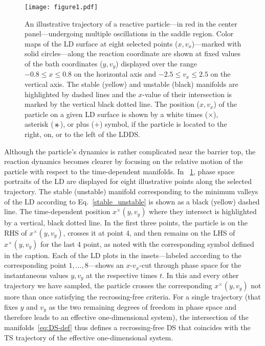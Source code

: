 \documentclass{elsarticle}
\def\EDITS#1{{\color{green}#1}}
\def\EDITS#1{#1}
\def\EDITS#1{{\color{mygreen}#1}}
\begin{document}
\begin{figure}[t]
\texttt{[image: figure1.pdf]}
\caption{%
An illustrative trajectory of a reactive 
particle---in red in the center panel---undergoing multiple 
oscillations in the saddle region. 
Color maps of the LD surface 
at eight selected 
points ($x, v_x$)---marked with solid circles---along
the reaction coordinate are shown at
fixed values of the bath coordinates ($y, v_y$)
displayed over the range  $-0.8 \leq x \leq 0.8$ on the horizontal 
axis and $-2.5 \leq v_x \leq 2.5$ on the vertical axis.
The stable (yellow) and unstable (black) manifolds are highlighted by dashed 
lines and the $x$-value of their intersection is marked by the vertical black 
dotted line.
The position ($x, v_x$) of the particle on a given LD surface
is shown by a white times ($\times$), asterisk ($\times\hspace{-2.5mm}+$), or 
plus ($+$) symbol, 
if the particle is located to the right, on, or to the left of
the LDDS.
}
\label{fig:trajectory}
\end{figure}

Although the particle's dynamics is rather complicated near the barrier top,
the reaction dynamics becomes clearer by focusing on the 
relative motion of the particle with respect to the time-dependent manifolds.
In \FIG~\ref{fig:trajectory}, phase space portraits of the 
LD are displayed
for eight illustrative points along the selected trajectory.
The stable (unstable) manifold corresponding to 
the minimum valleys of the LD according to Eq.~\eqref{stable_unstable} 
is shown as a black (yellow) dashed line.
The time-dependent position $x^\times(y,v_y)$ where they intersect is highlighted
by a vertical, black dotted line.
In the first three points, the particle is on the RHS of $x^\times(y,v_y)$, crosses it
at point 4, and then remains on the LHS of $x^\times(y,v_y)$ for the last 4 point,
as noted with the corresponding symbol defined in the caption.
Each of the LD plots in the insets---labeled according to the corresponding
point $1,\ldots,8$---shows an $x$-$v_x$-cut through phase space for the
instantaneous values $y,v_y$ at the respective times $t$.
% 
In this and every other trajectory we have sampled, 
the particle crosses the corresponding 
$x^\times(y,v_y)$ \EDITS{not more than} once satisfying the
recrossing-free criteria.
For a single trajectory (that fixes $y$ and $v_y$ as the two remaining
degrees of freedom \EDITS{in phase space} and therefore leads to an effective one-dimensional system),
the intersection of the manifolds~\eqref{eq:DS-def} 
thus defines a recrossing-free 
DS 
that coincides with the TS trajectory of the effective one-dimensional system.
\end{document}
